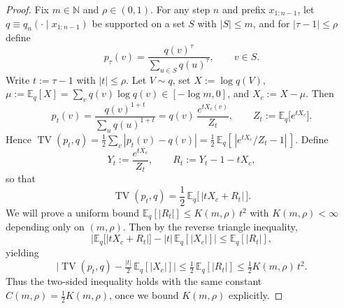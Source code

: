 \begin{proof}
Fix $m\in\mathbb{N}$ and $\rho\in(0,1)$. For any step $n$ and prefix $x_{1:n-1}$, let $q\equiv q_n(\cdot\mid x_{1:n-1})$ be supported on a set $S$ with $|S|\le m$, and for $|\tau-1|\le\rho$ define
\[
 p_{\tau}(v)=\frac{q(v)^{\tau}}{\sum_{u\in S}q(u)^{\tau}},\qquad v\in S.
\]
Write $t:=\tau-1$ with $|t|\le\rho$. Let $V\sim q$, set $X:=\log q(V)$, $\mu:=\mathbb{E}_q[X]=\sum_v q(v)\log q(v)\in[-\log m,0]$, and $X_c:=X-\mu$. Then
\[
 p_t(v)=\frac{q(v)^{1+t}}{\sum_u q(u)^{1+t}}=q(v)\,\frac{e^{tX_c(v)}}{Z_t},\qquad Z_t:=\mathbb{E}_q\big[e^{tX_c}\big].
\]
Hence $\operatorname{TV}(p_t,q)=\tfrac12\sum_v|p_t(v)-q(v)|=\tfrac12\,\mathbb{E}_q[\,|e^{tX_c}/Z_t-1|\,]$. Define
\[
Y_t:=\frac{e^{tX_c}}{Z_t},\qquad R_t:=Y_t-1-tX_c,
\]
so that
\[
\operatorname{TV}(p_t,q)=\frac12\,\mathbb{E}_q\big[\,|tX_c+R_t|\,\big].
\]
We will prove a uniform bound $\mathbb{E}_q[|R_t|]\le K(m,\rho)\,t^2$ with $K(m,\rho)<\infty$ depending only on $(m,\rho)$. Then by the reverse triangle inequality,
\[
\Big|\mathbb{E}_q\big[|tX_c+R_t|\big]-|t|\,\mathbb{E}_q[|X_c|]\Big|\le \mathbb{E}_q[|R_t|],
\]
yielding
\[
\Big|\operatorname{{TV}}(p_t,q)-\tfrac{|t|}{2}\,\mathbb{E}_q[|X_c|]\Big|\le \tfrac12\,\mathbb{E}_q[|R_t|]\le \tfrac12 K(m,\rho)\,t^2.
\]
Thus the two-sided inequality holds with the same constant $C(m,\rho)=\tfrac12 K(m,\rho)$, once we bound $K(m,\rho)$ explicitly.


\end{proof}

